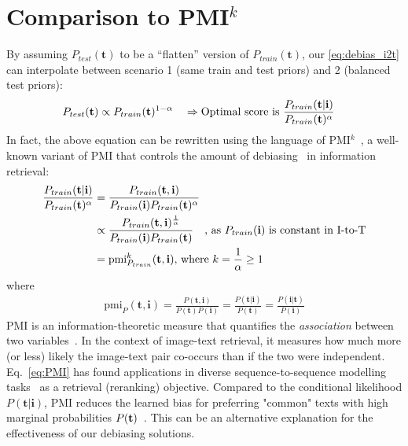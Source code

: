\documentclass{article} \usepackage{iclr2024_conference,times}
\begin{document}
        





















\section{Comparison to PMI$^k$}
\label{app:pmi}
By assuming $P_{test}(\mathbf{t})$ to be a ``flatten'' version of $P_{train}(\mathbf{t})$, our \autoref{eq:debias_i2t} can interpolate between scenario 1 (same train and test priors) and 2 (balanced test priors):
\begin{align}
P_{test}(\mathbf{t}) \propto P_{train}(\mathbf{t})^{1-\alpha} \quad \Rightarrow \text{Optimal score is }& \frac{P_{train}(\mathbf{t}| \mathbf{i})}{P_{train}({\bf t})^{\alpha}}
\end{align}
In fact, the above equation can be rewritten using the language of PMI$^k$~\citep{role2011handling, daille1994approche}, a well-known variant of PMI that controls the amount of debiasing~\citep{pmimt1, pmimt2, pmiretrieval} in information retrieval:
\begin{align}
    \frac{P_{train}(\mathbf{t}| \mathbf{i})}{P_{train}({\bf t})^{\alpha}}
    &= \frac{P_{train}(\mathbf{t}, \mathbf{i})}{P_{train}(\mathbf{i}) P_{train}(\mathbf{t})^{\alpha}} \\
    &\propto \frac{P_{train}(\mathbf{t}, \mathbf{i})^{\frac{1}{\alpha}}}{P_{train}(\mathbf{i}) P_{train}(\mathbf{t})} \quad \text{, as }P_{train}(\mathbf{i})\text{ is constant in I-to-T} \\
    &= \text{pmi}^{k}_{P_{train}}(\mathbf{t}, \mathbf{i})\text{, where } k = \frac{1}{\alpha} \geq 1
\label{eq:alpha_pmi}
\end{align}
where 
\begin{align}
    \text{pmi}_{P}(\mathbf{t}, \mathbf{i}) = \frac{P(\mathbf{t}, \mathbf{i})}{P(\mathbf{t}) P(\mathbf{i})} = \frac{P(\mathbf{t} | \mathbf{i})}{P(\mathbf{t})} = \frac{P(\mathbf{i} | \mathbf{t})}{P(\mathbf{i})}
\label{eq:PMI}
\end{align}
PMI is an information-theoretic measure that quantifies the {\em association} between two variables~\citep{yao2010co, henning2017estimating, shrivastava2021clip}. In the context of image-text retrieval, it measures how much more (or less) likely the image-text pair co-occurs than if the two were independent. Eq.~\ref{eq:PMI} has found applications in diverse sequence-to-sequence modelling tasks~\citep{pmiretrieval, pmimt2, pmimt1} as a retrieval (reranking) objective. Compared to the conditional likelihood $P(\mathbf{t}|\mathbf{i})$, PMI reduces the learned bias for preferring "common" texts with high marginal probabilities $P({\bf t})$~\citep{pmimt1, pmimt2, pmiretrieval}. This can be an alternative explanation for the effectiveness of our debiasing solutions. 
\end{document}
